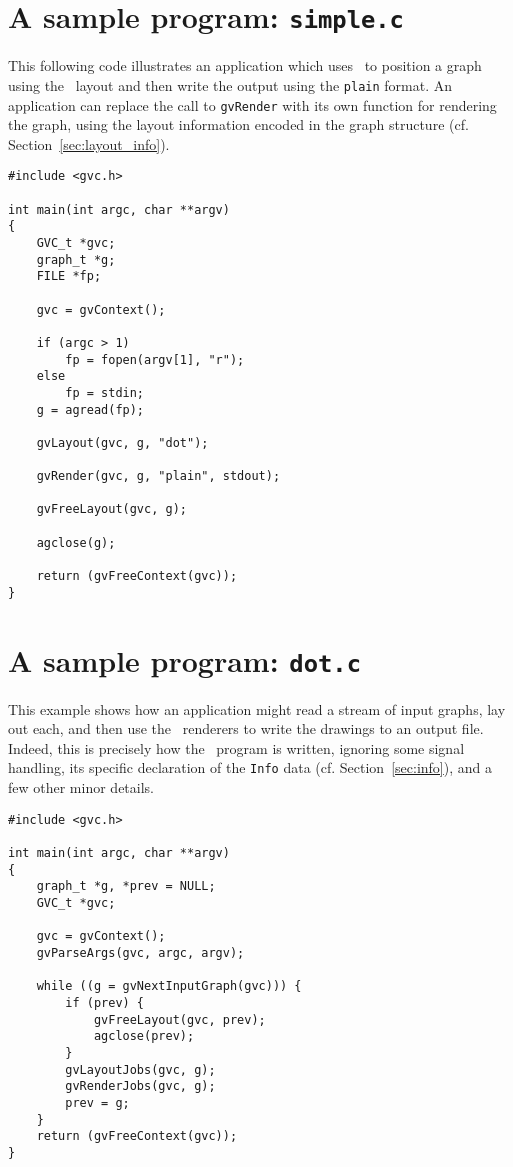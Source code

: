 \section{A sample program: {\tt simple.c}}
\label{sec:simple}
This following code illustrates an application which uses \gviz\ to
position a graph using the \dot\ layout and then write the output
using the {\tt plain} format.
An application can replace the call to {\tt gvRender} with its own
function for rendering the graph, using the layout information
encoded in the graph structure (cf. Section~\ref{sec:layout_info}).
\pagebreak[4]
\begin{verbatim}
#include <gvc.h>

int main(int argc, char **argv)
{
    GVC_t *gvc; 
    graph_t *g;
    FILE *fp;

    gvc = gvContext();

    if (argc > 1)
        fp = fopen(argv[1], "r");
    else    
        fp = stdin;
    g = agread(fp);

    gvLayout(gvc, g, "dot");

    gvRender(gvc, g, "plain", stdout);

    gvFreeLayout(gvc, g);

    agclose(g);

    return (gvFreeContext(gvc));
}
\end{verbatim}

\section{A sample program: {\tt dot.c}}
\label{sec:dot}
This example shows how an application might read a stream of input graphs,
lay out each, and then use the \gviz\ renderers to write the drawings
to an output file. Indeed, this
is precisely how the \dot\ program is written, ignoring some signal
handling, its specific declaration of 
the {\tt Info} data (cf. Section~\ref{sec:info}), and a few other
minor details.
\begin{verbatim}
#include <gvc.h>
    
int main(int argc, char **argv)
{   
    graph_t *g, *prev = NULL;
    GVC_t *gvc;

    gvc = gvContext();
    gvParseArgs(gvc, argc, argv);
    
    while ((g = gvNextInputGraph(gvc))) {
        if (prev) {
            gvFreeLayout(gvc, prev);
            agclose(prev);
        }
        gvLayoutJobs(gvc, g); 
        gvRenderJobs(gvc, g);
        prev = g;
    }
    return (gvFreeContext(gvc));
}

\end{verbatim}

